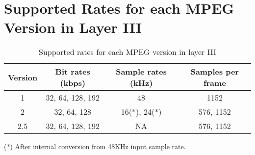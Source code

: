\documentclass{rep}
\theoremstyle{plain}
\begin{document}
\section{Supported Rates for each MPEG Version in Layer III}
\label{sec:rates}

\begin{table}[H]
  \begin{center}
    \begin{tabular}{|c|c|c|c|}
      \hline

      \rowcolor{iob-green}
      \textbf{Version} & \textbf{Bit rates (kbps)} & \textbf{Sample rates (kHz)} & \textbf{Samples per frame}\\
      \hline
      \hline

      1 & 32, 64, 128, 192 & 48 & 1152\\ \hline

      \rowcolor{iob-blue} 
      2 & 32, 64, 128 & 16(*), 24(*) & 576, 1152\\ \hline

      2.5 & 32, 64, 128, 192 & NA & 576, 1152\\ \hline

    \end{tabular}
    \caption{Supported rates for each MPEG version in layer III}
    \label{tab:rates}
  \end{center}

  (*) After internal conversion from 48KHz input sample rate.
    
\end{table}

%
%
\end{document}
